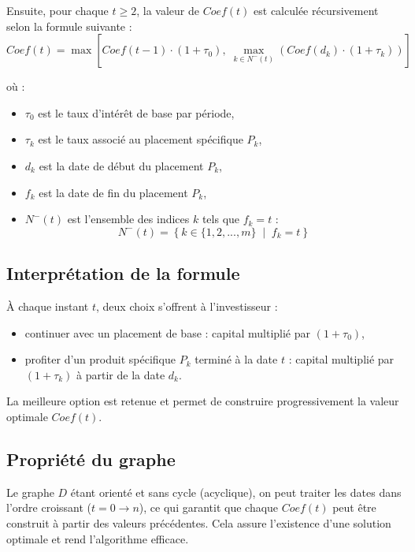 \documentclass[a4paper,11pt]{article}
\begin{document}
Ensuite, pour chaque $t \geq 2$, la valeur de $Coef(t)$ est calculée récursivement selon la formule suivante :
\[
	Coef(t) = \max \left[
		Coef(t-1) \cdot (1 + \tau_0), \;
		\max_{k \in N^-(t)} \left( Coef(d_k) \cdot (1 + \tau_k) \right)
	\right]
\]

où :

\begin{itemize}
	\item $\tau_0$ est le taux d’intérêt de base par période,
	\item $\tau_k$ est le taux associé au placement spécifique $P_k$,
	\item $d_k$ est la date de début du placement $P_k$,
	\item $f_k$ est la date de fin du placement $P_k$,
	\item $N^-(t)$ est l’ensemble des indices $k$ tels que $f_k = t$ :
	      \[
	      	N^-(t) = \left\{ k \in \{1, 2, ..., m\} \;\middle|\; f_k = t \right\}
	      \]
\end{itemize}





\subsection{Interprétation de la formule}

À chaque instant $t$, deux choix s’offrent à l’investisseur :
\begin{itemize}
	\item continuer avec un placement de base : capital multiplié par $(1 + \tau_0)$,
	\item profiter d’un produit spécifique $P_k$ terminé à la date $t$ : capital multiplié par $(1 + \tau_k)$ à partir de la date $d_k$.
\end{itemize}

La meilleure option est retenue et permet de construire progressivement la valeur optimale $Coef(t)$.

\subsection{Propriété du graphe}

Le graphe $D$ étant orienté et sans cycle (acyclique), on peut traiter les dates dans l’ordre croissant ($t = 0 \to n$), ce qui garantit que chaque $Coef(t)$ peut être construit à partir des valeurs précédentes. Cela assure l’existence d’une solution optimale et rend l’algorithme efficace.
\end{document}
